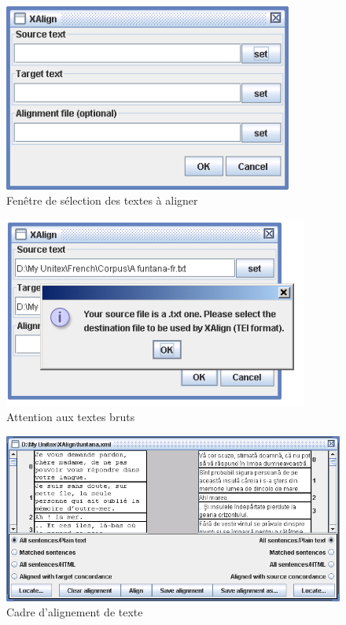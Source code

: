\begin{figure}[!ht]
\begin{center}
\includegraphics[width=9.5cm]{resources/img/figX-1.png}
\caption{Fenêtre de sélection des textes à aligner\label{fig-x-text-selection}}
\end{center}
\end{figure}

\begin{figure}[!ht]
\begin{center}
\includegraphics[width=10cm]{resources/img/figX-2.png}
\caption{Attention aux textes bruts\label{fig-x-tei-name}}
\end{center}
\end{figure}
\clearpage

\begin{figure}[!ht]
\begin{center}
\includegraphics[width=15.5cm]{resources/img/figX-3.png}
\caption{Cadre d'alignement de texte\label{fig-x-frame}}
\end{center}
\end{figure}

